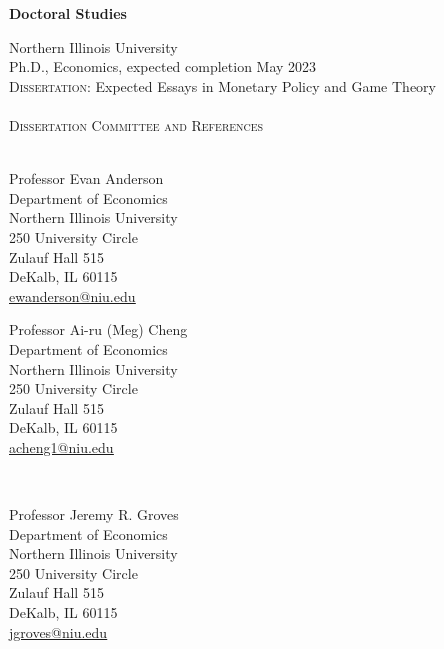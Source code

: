 \documentclass[final]{article}
\begin{document}
	
	\begin{minipage}[t]{.20\textwidth}
		\Large{\textbf{Doctoral Studies}}
	\end{minipage}
	\begin{minipage}[t]{.80\textwidth}
		Northern Illinois University \\
		Ph.D., Economics, expected completion May 2023 \\
		\textsc{Dissertation:} Expected Essays in Monetary Policy and Game Theory \\
		\\
		\textsc{Dissertation Committee and References} \\
		\\
		\begin{minipage}{.40\textwidth}
			Professor Evan Anderson \\
			Department of Economics \\
			Northern Illinois University \\
			250 University Circle\\
		 	Zulauf Hall 515 \\
			DeKalb, IL 60115 \\
			\underline{\href{mailto:ewanderson@niu.edu}{ewanderson@niu.edu}}\\
		\end{minipage}
		\begin{minipage}{.40\textwidth}
			Professor Ai-ru (Meg) Cheng \\
			Department of Economics \\
			Northern Illinois University \\
			250 University Circle \\
			Zulauf Hall 515 \\
			DeKalb, IL 60115 \\
			\underline{\href{mailto:acheng1@niu.edu}{acheng1@niu.edu}}\\
		\end{minipage} \\
		\begin{minipage}{.40\textwidth}
			Professor Jeremy R. Groves \\
			Department of Economics \\
			Northern Illinois University \\
			250 University Circle\\
			Zulauf Hall 515 \\
			DeKalb, IL 60115 \\
			\underline{\href{mailto:jgroves@niu.edu}{jgroves@niu.edu}}\\

\end{minipage}
\end{minipage}
\end{document}
